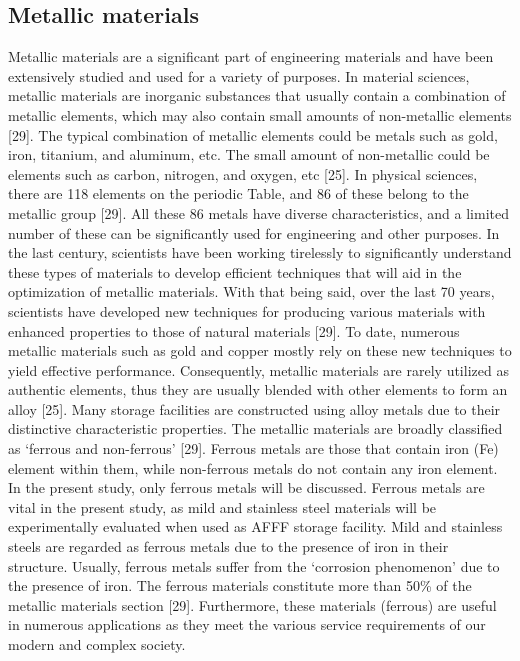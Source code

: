 \documentclass[12pt]{report}
\begin{document}
\subsection{Metallic materials}
Metallic materials are a significant part of engineering materials and have been extensively studied and used for a variety of purposes.  In material sciences, metallic materials are inorganic substances that usually contain a combination of metallic elements, which may also contain small amounts of non-metallic elements [29]. The typical combination of metallic elements could be metals such as gold, iron, titanium, and aluminum, etc. The small amount of non-metallic could be elements such as carbon, nitrogen, and oxygen, etc [25]. In physical sciences, there are 118 elements on the periodic Table, and 86 of these belong to the metallic group [29]. All these 86 metals have diverse characteristics, and a limited number of these can be significantly used for engineering and other purposes.  
In the last century, scientists have been working tirelessly to significantly understand these types of materials to develop efficient techniques that will aid in the optimization of metallic materials. With that being said, over the last 70 years, scientists have developed new techniques for producing various materials with enhanced properties to those of natural materials [29]. To date, numerous metallic materials such as gold and copper mostly rely on these new techniques to yield effective performance. Consequently, metallic materials are rarely utilized as authentic elements, thus they are usually blended with other elements to form an alloy [25]. Many storage facilities are constructed using alloy metals due to their distinctive characteristic properties.
The metallic materials are broadly classified as ‘ferrous and non-ferrous’ [29]. Ferrous metals are those that contain iron (Fe) element within them, while non-ferrous metals do not contain any iron element. In the present study, only ferrous metals will be discussed. Ferrous metals are vital in the present study, as mild and stainless steel materials will be experimentally evaluated when used as AFFF storage facility.  Mild and stainless steels are regarded as ferrous metals due to the presence of iron in their structure. Usually, ferrous metals suffer from the ‘corrosion phenomenon’ due to the presence of iron. The ferrous materials constitute more than 50\% of the metallic materials section [29]. Furthermore, these materials (ferrous) are useful in numerous applications as they meet the various service requirements of our modern and complex society.
\end{document}
